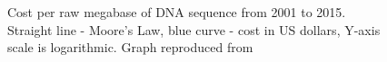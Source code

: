 \chapter{}
\vspace*{-0.3in}
\begin{figure}[hb!]
\begin{center}
\end{center}
\caption[Cost per raw megabase of DNA sequence from 2001 to 2015]{Cost per raw megabase of DNA sequence from 2001 to 2015. Straight line - Moore's Law, blue curve - cost in US dollars, Y-axis scale is logarithmic. Graph reproduced from \citep{wetterstrand2016}}
\end{figure}

